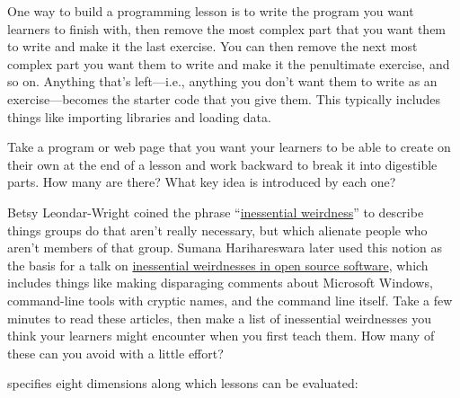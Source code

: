 
One way to build a programming lesson is to write the program you want
learners to finish with, then remove the most complex part that you
want them to write and make it the last exercise. You can then remove
the next most complex part you want them to write and make it the
penultimate exercise, and so on. Anything that's left---i.e., anything
you don't want them to write as an exercise---becomes the starter code
that you give them. This typically includes things like importing
libraries and loading data.

Take a program or web page that you want your learners to be able to
create on their own at the end of a lesson and work backward to break
it into digestible parts.  How many are there?  What key idea is
introduced by each one?


Betsy Leondar-Wright coined the phrase
``\href{http://www.classmatters.org/2006_07/its-not-them.php}{inessential
  weirdness}'' to describe things groups do that aren't really
necessary, but which alienate people who aren't members of that group.
Sumana Harihareswara later used this notion as the basis for a talk on
\href{https://www.harihareswara.net/sumana/2016/05/21/0}{inessential
  weirdnesses in open source software}, which includes things like
making disparaging comments about Microsoft Windows, command-line
tools with cryptic names, and the command line itself.  Take a few
minutes to read these articles, then make a list of inessential
weirdnesses you think your learners might encounter when you first
teach them. How many of these can you avoid with a little effort?


\cite{Mart2017} specifies eight dimensions along which lessons can be
evaluated:

